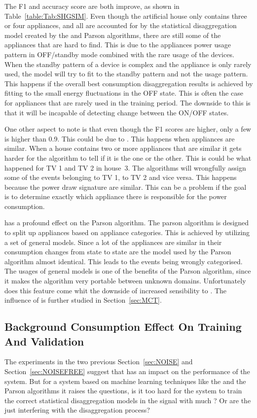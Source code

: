 The F1 and accuracy score are both improve, as shown in Table~\ref{table:Tab:SHGSIM}. Even though the artificial house only contains three or four appliances, and all are accounted for by the statistical disaggregation model created by the  and Parson algorithms, there are still some of the appliances that are hard to find. This is due to the appliances power usage pattern in OFF/standby mode combined with the rare usage of the devices. When the standby pattern of a device is complex and the appliance is only rarely used, the model will try to fit to the standby pattern and not the usage pattern. This happens if the overall best consumption disaggregation results is achieved by fitting to the small energy fluctuations in the OFF state. This is often the case for appliances that are rarely used in the training period. The downside to this is that it will be incapable of detecting change between the ON/OFF states.

One other aspect to note is that even though the F1 scores are higher, only a few is higher than 0.9. 
This could be due to . This happens when appliances are similar. When a house contains two or more appliances that are similar it gets harder for the algorithm to tell if it is the one or the other. This is could be what happened for TV 1 and TV 2 in house~3. The algorithms will wrongfully assign some of the events belonging to TV 1, to TV 2 and vice versa. This happens because the power draw signature are similar.  This can be a problem if the goal is to determine exactly which appliance there is responsible for the power consumption.

 has a profound effect on the Parson algorithm. The parson algorithm is designed to split up appliances based on appliance categories. This is achieved by utilizing a set of general models. Since a lot of the appliances are similar in their consumption changes from state to state are the model used by the Parson algorithm almost identical. This leads to the events being wrongly categorised. The usages of general models is one of the benefits of the Parson algorithm, since it makes the algorithm very portable between unknown domains. Unfortunately does this feature come whit the downside of increased sensibility to . The influence of  is further studied in Section~\ref{sec:MCT}. 


\newpage

\subsection{Background Consumption Effect On Training And Validation }
The experiments in the two previous Section~\ref{sec:NOISE} and Section~\ref{sec:NOISEFREE} suggest that  has an impact on the performance of the system. But for a system based on machine learning techniques like the  and the Parson algorithms it raises the questions, is it too hard for the system to train the correct statistical disaggregation models in the signal with much ? Or are the  just interfering with the disaggregation process? 

